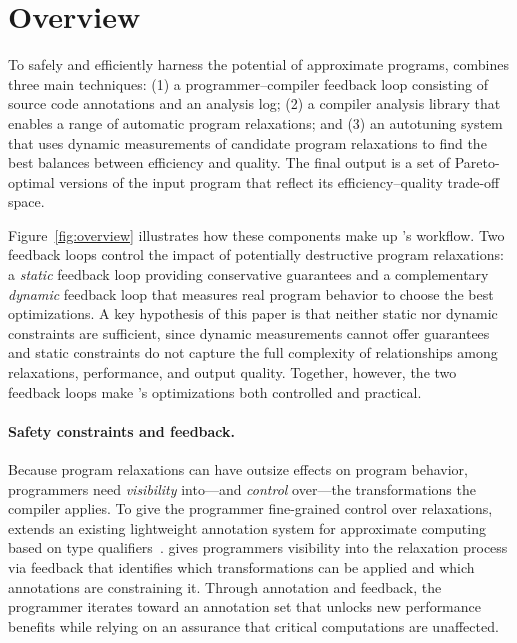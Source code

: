 \section{Overview}


To safely and efficiently harness the potential of approximate programs,
\sysname combines three main techniques: (1) a programmer--compiler
feedback loop consisting of source code annotations and an analysis log; (2) a
compiler analysis library
that enables a range of automatic program relaxations; and (3) an autotuning
system that uses dynamic measurements of candidate program relaxations to find
the best balances between efficiency and quality. The final output is a set of
Pareto-optimal versions of the input program that reflect its
efficiency--quality trade-off space.

Figure~\ref{fig:overview} illustrates
how these components make up \sysname's workflow.
Two feedback loops control the impact of
potentially destructive program relaxations: a \emph{static} feedback loop
providing
conservative guarantees
and a complementary \emph{dynamic} feedback loop that measures real
program behavior to choose the best optimizations.
%
A key hypothesis of this paper is that neither static nor dynamic constraints
are sufficient, since dynamic measurements cannot offer guarantees and static
constraints do not capture the full complexity of relationships among
relaxations, performance, and output quality. Together, however, the two
feedback loops make \sysname's optimizations both controlled and practical.
%

\paragraph{Safety constraints and feedback.}
Because program relaxations can have outsize effects on program behavior,
programmers need \emph{visibility} into---and \emph{control} over---the
transformations the compiler applies.
%
To give the programmer fine-grained control over relaxations, \sysname extends
an existing lightweight annotation system for approximate computing based on
type qualifiers~\cite{enerj}.
%
\sysname gives programmers visibility into the relaxation process via feedback
that identifies which transformations can be applied and which annotations are
constraining it.  Through annotation and feedback, the programmer iterates
toward an annotation set that unlocks new performance benefits while relying on
an assurance that critical computations are unaffected.

